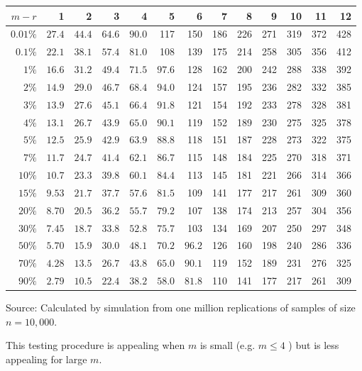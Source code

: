 \documentclass[10pt]{article}
\begin{document}
\begin{tabular}{rrrrrrrrrrrrr}
$m-r$ & 1 & 2 & 3 & 4 & 5 & 6 & 7 & 8 & 9 & 10 & 11 & 12 \\
\hline
$0.01 \%$ & $27.4$ & $44.4$ & $64.6$ & $90.0$ & 117 & 150 & 186 & 226 & 271 & 319 & 372 & 428 \\
$0.1 \%$ & $22.1$ & $38.1$ & $57.4$ & $81.0$ & 108 & 139 & 175 & 214 & 258 & 305 & 356 & 412 \\
$1 \%$ & $16.6$ & $31.2$ & $49.4$ & $71.5$ & $97.6$ & 128 & 162 & 200 & 242 & 288 & 338 & 392 \\
$2 \%$ & $14.9$ & $29.0$ & $46.7$ & $68.4$ & $94.0$ & 124 & 157 & 195 & 236 & 282 & 332 & 385 \\
$3 \%$ & $13.9$ & $27.6$ & $45.1$ & $66.4$ & $91.8$ & 121 & 154 & 192 & 233 & 278 & 328 & 381 \\
$4 \%$ & $13.1$ & $26.7$ & $43.9$ & $65.0$ & $90.1$ & 119 & 152 & 189 & 230 & 275 & 325 & 378 \\
$5 \%$ & $12.5$ & $25.9$ & $42.9$ & $63.9$ & $88.8$ & 118 & 151 & 187 & 228 & 273 & 322 & 375 \\
$7 \%$ & $11.7$ & $24.7$ & $41.4$ & $62.1$ & $86.7$ & 115 & 148 & 184 & 225 & 270 & 318 & 371 \\
$10 \%$ & $10.7$ & $23.3$ & $39.8$ & $60.1$ & $84.4$ & 113 & 145 & 181 & 221 & 266 & 314 & 366 \\
$15 \%$ & $9.53$ & $21.7$ & $37.7$ & $57.6$ & $81.5$ & 109 & 141 & 177 & 217 & 261 & 309 & 360 \\
$20 \%$ & $8.70$ & $20.5$ & $36.2$ & $55.7$ & $79.2$ & 107 & 138 & 174 & 213 & 257 & 304 & 356 \\
$30 \%$ & $7.45$ & $18.7$ & $33.8$ & $52.8$ & $75.7$ & 103 & 134 & 169 & 207 & 250 & 297 & 348 \\
$50 \%$ & $5.70$ & $15.9$ & $30.0$ & $48.1$ & $70.2$ & $96.2$ & 126 & 160 & 198 & 240 & 286 & 336 \\
$70 \%$ & $4.28$ & $13.5$ & $26.7$ & $43.8$ & $65.0$ & $90.1$ & 119 & 152 & 189 & 231 & 276 & 325 \\
$90 \%$ & $2.79$ & $10.5$ & $22.4$ & $38.2$ & $58.0$ & $81.8$ & 110 & 141 & 177 & 217 & 261 & 309 \\
\hline
\end{tabular}

Source: Calculated by simulation from one million replications of samples of size $n=10,000$.

This testing procedure is appealing when $m$ is small (e.g. $m \leq 4$ ) but is less appealing for large $m$.
\end{document}
